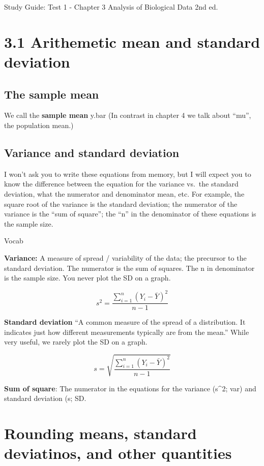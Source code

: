 \documentclass[]{book}
\theoremstyle{definition}
\theoremstyle{definition}
\theoremstyle{definition}
\theoremstyle{remark}
\begin{document}
Study Guide: Test 1 - Chapter 3 Analysis of Biological Data 2nd ed.

\section{3.1 Arithemetic mean and standard
deviation}\label{arithemetic-mean-and-standard-deviation}

\subsection{The sample mean}\label{the-sample-mean}

We call the \textbf{sample mean} y.bar (In contrast in chapter 4 we talk
about ``mu'', the population mean.)

\subsection{Variance and standard
deviation}\label{variance-and-standard-deviation}

I won't ask you to write these equations from memory, but I will expect
you to know the difference between the equation for the variance vs.~the
standard deviation, what the numerator and denominator mean, etc. For
example, the square root of the variance is the standard deviation; the
numerator of the variance is the ``sum of square''; the ``n'' in the
denominator of these equations is the sample size.

Vocab

\textbf{Variance:} A measure of spread / variability of the data; the
precursor to the standard deviation. The numerator is the sum of
squares. The n in denominator is the sample size. You never plot the SD
on a graph.

\[s^2 = {\frac{\sum\limits_{i=1}^{n} \left(Y_{i} - \bar{Y}\right)^{2}} {n-1}}\]

\textbf{Standard deviation} ``A common measure of the spread of a
distribution. It indicates just how different measurements typically are
from the mean.'' While very useful, we rarely plot the SD on a graph.

\[s = \sqrt{\frac{\sum\limits_{i=1}^{n} \left(Y_{i} - \bar{Y}\right)^{2}} {n-1}}\]

\textbf{Sum of square}: The numerator in the equations for the variance
(s\^{}2; var) and standard deviation (s; SD.

\section{Rounding means, standard deviatinos, and other
quantities}\label{rounding-means-standard-deviatinos-and-other-quantities}
\end{document}
